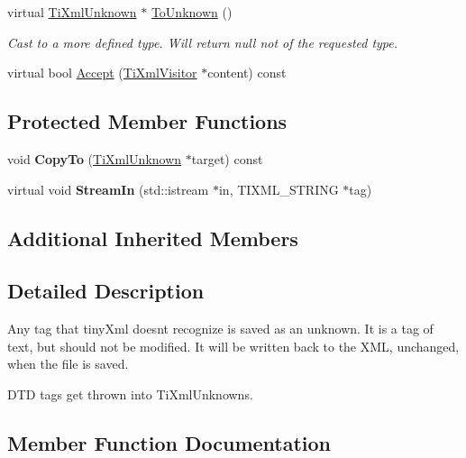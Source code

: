 \begin{DoxyCompactItemize}
\mbox{\label{class_ti_xml_unknown_a67c9fd22940e8c47f706a72cdd2e332c}} 
virtual \hyperlink{class_ti_xml_unknown}{Ti\+Xml\+Unknown} $\ast$ \hyperlink{class_ti_xml_unknown_a67c9fd22940e8c47f706a72cdd2e332c}{To\+Unknown} ()
\begin{DoxyCompactList}\small\item\em Cast to a more defined type. Will return null not of the requested type. \end{DoxyCompactList}\item 
virtual bool \hyperlink{class_ti_xml_unknown_aafdf1b2d4f561979c7907bad91004999}{Accept} (\hyperlink{class_ti_xml_visitor}{Ti\+Xml\+Visitor} $\ast$content) const
\end{DoxyCompactItemize}
\subsection*{Protected Member Functions}
\begin{DoxyCompactItemize}
\item 
\mbox{\label{class_ti_xml_unknown_afeb334446bcbe13ce15131e1629712be}} 
void {\bfseries Copy\+To} (\hyperlink{class_ti_xml_unknown}{Ti\+Xml\+Unknown} $\ast$target) const
\item 
\mbox{\label{class_ti_xml_unknown_adf84a317816124a2d7c7947d36170458}} 
virtual void {\bfseries Stream\+In} (std\+::istream $\ast$in, T\+I\+X\+M\+L\+\_\+\+S\+T\+R\+I\+NG $\ast$tag)
\end{DoxyCompactItemize}
\subsection*{Additional Inherited Members}


\subsection{Detailed Description}
Any tag that tiny\+Xml doesn\textquotesingle{}t recognize is saved as an unknown. It is a tag of text, but should not be modified. It will be written back to the X\+ML, unchanged, when the file is saved.

D\+TD tags get thrown into Ti\+Xml\+Unknowns. 

\subsection{Member Function Documentation}
\mbox{\label{class_ti_xml_unknown_aafdf1b2d4f561979c7907bad91004999}} 
